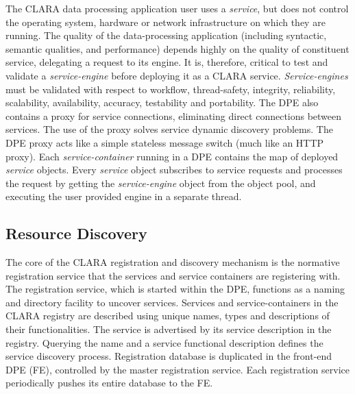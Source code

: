 \documentclass[a4paper]{jpconf}
\begin{document}
The CLARA data processing application user uses a \textit{service},
but does not control the operating system,
hardware or network infrastructure on which they are running.
The quality of the data-processing application
(including syntactic, semantic qualities, and performance)
depends highly on the quality of constituent service,
delegating a request to its engine.
It is, therefore, critical to test and validate a \textit{service-engine}
before deploying it as a CLARA service.
\textit{Service-engines} must be validated with respect to workflow,
thread-safety, integrity, reliability, scalability, availability, accuracy,
testability and portability.
The DPE also contains a proxy for service connections,
eliminating direct connections between services.
The use of the proxy solves service dynamic discovery problems.
The DPE proxy acts like a simple stateless message switch
(much like an HTTP proxy).
Each \textit{service-container} running in a DPE
contains the map of deployed \textit{service} objects.
Every \textit{service} object subscribes to service requests
and processes the request
by getting the \textit{service-engine} object from the object pool,
and executing the user provided engine in a separate thread.


\subsection{Resource Discovery}

The core of the CLARA registration and discovery mechanism
is the normative registration service
that the services and service containers are registering with.
The registration service, which is started within the DPE,
functions as a naming and directory facility to uncover services.
Services and service-containers in the CLARA registry are described
using unique names, types and descriptions of their functionalities.
The service is advertised by its service description in the registry.
Querying the name and a service functional description
defines the service discovery process.
Registration database is duplicated in the front-end DPE (FE),
controlled by the master registration service.
Each registration service periodically pushes its entire database to the FE.
\end{document}
